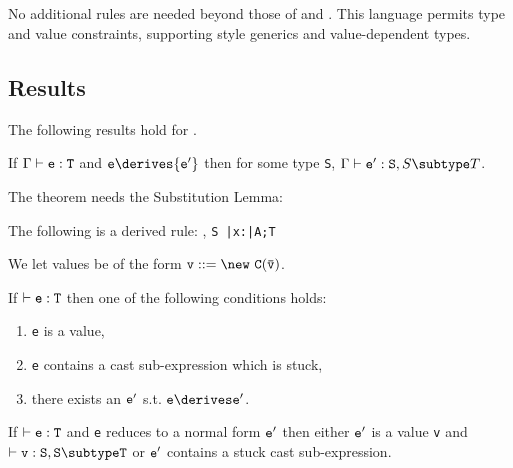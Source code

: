 \subsection{\FXGD} 

No additional rules are needed beyond those of \FXG{} and \FXD{}. This
language permits type and value constraints, supporting \FGJ{} style
generics and value-dependent types.


\subsection{Results}
The following results hold for \FXGD.

\begin{theorem} If $\Gamma \vdash {\tt e:T}$ and ${\tt e} \derives {\tt e'}$ then for some type {\tt S}, $\Gamma \vdash {\tt e':S},{S \subtype T}$.
\end{theorem}

The theorem needs the Substitution Lemma:
\begin{lemma} The following is a derived rule:
{\Gamma {}, {\tt S \subtype \bar{\tt x}:\bar{\tt A};T}}
\end{lemma}

We let values be of the form $\tt v ::= \new\ C(\bar{\tt v})$. 
\begin{theorem}[Progress]
If $\vdash {\tt e:T}$ then one of the following conditions holds:
\begin{enumerate}
\item {\tt e} is a value,
\item {\tt e} contains a cast sub-expression which is stuck,
\item there exists an $\tt e'$ s.t. $\tt e\derives e'$.
\end{enumerate}
\end{theorem}

\begin{theorem}
If $\vdash {\tt e:T}$ and {\tt e} reduces to a normal form ${\tt e'}$ then
either $\tt e'$ is a value {\tt v} and $\vdash {\tt v:S},{\tt S\subtype T}$ or
${\tt e'}$ contains  a stuck cast sub-expression.
\end{theorem}






